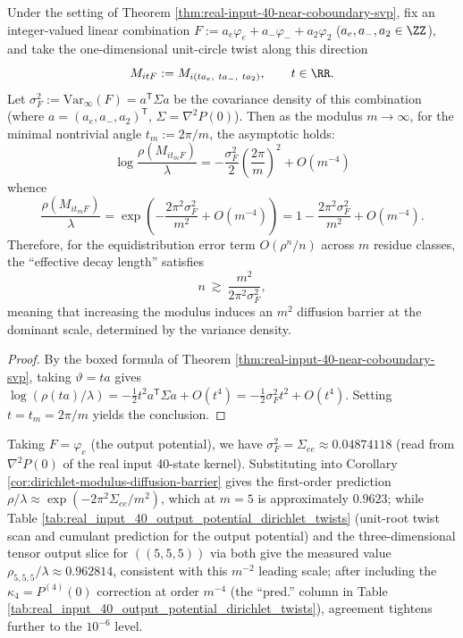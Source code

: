 \begin{corollary}\label{cor:dirichlet-modulus-diffusion-barrier}
Under the setting of Theorem \ref{thm:real-input-40-near-coboundary-svp}, fix an integer-valued linear combination
\(
F:=a_e\varphi_e+a_-\varphi_-+a_2\varphi_2
\)
(\(a_e,a_-,a_2\in\ZZ\)), and take the one-dimensional unit-circle twist along this direction
\[
M_{itF}:=M_{i(t a_e,\ t a_-,\ t a_2)},\qquad t\in\RR.
\]
Let
\(
\sigma_F^2:=\mathrm{Var}_\infty(F)=a^{\mathsf T}\Sigma a
\)
be the covariance density of this combination (where \(a=(a_e,a_-,a_2)^{\mathsf T}\), \(\Sigma=\nabla^2P(0)\)).
Then as the modulus \(m\to\infty\), for the minimal nontrivial angle \(t_m:=2\pi/m\), the asymptotic holds:
\[
\boxed{\;
\log\frac{\rho(M_{it_mF})}{\lambda}
=-\frac{\sigma_F^2}{2}\left(\frac{2\pi}{m}\right)^2+O(m^{-4})
\;}
\]
whence
\[
\boxed{\;
\frac{\rho(M_{it_mF})}{\lambda}
=\exp\!\left(-\frac{2\pi^2\sigma_F^2}{m^2}+O(m^{-4})\right)
=1-\frac{2\pi^2\sigma_F^2}{m^2}+O(m^{-4}).
\;}
\]
Therefore, for the equidistribution error term \(O(\rho^n/n)\) across $m$ residue classes, the ``effective decay length'' satisfies
\[
n\ \gtrsim\ \frac{m^2}{2\pi^2\sigma_F^2},
\]
meaning that increasing the modulus induces an \(m^2\) diffusion barrier at the dominant scale, determined by the variance density.
\end{corollary}

\begin{proof}
By the boxed formula of Theorem \ref{thm:real-input-40-near-coboundary-svp}, taking \(\vartheta=t a\) gives
\(
\log(\rho(ta)/\lambda)=-\frac12 t^2 a^{\mathsf T}\Sigma a+O(t^4)
=-\frac12\sigma_F^2 t^2+O(t^4)
\).
Setting \(t=t_m=2\pi/m\) yields the conclusion.
\end{proof}

\begin{remark}[Numerical Closed-Loop: The Worst Ratio for the Output Potential at \texorpdfstring{$m=5$}{m=5}]
Taking \(F=\varphi_e\) (the output potential), we have \(\sigma_F^2=\Sigma_{ee}\approx 0.04874118\) (read from \(\nabla^2P(0)\) of the real input 40-state kernel).
Substituting into Corollary \ref{cor:dirichlet-modulus-diffusion-barrier} gives the first-order prediction
\(
\rho/\lambda\approx \exp(-2\pi^2\Sigma_{ee}/m^2)
\), which at \(m=5\) is approximately \(0.9623\);
while Table \ref{tab:real_input_40_output_potential_dirichlet_twists} (unit-root twist scan and cumulant prediction for the output potential) and the three-dimensional tensor output slice for \(((5,5,5))\) via \verb|| both give the measured value
\(
\rho_{5,5,5}/\lambda\approx 0.962814
\), consistent with this \(m^{-2}\) leading scale; after including the \(\kappa_4=P^{(4)}(0)\) correction at order \(m^{-4}\) (the ``pred.'' column in Table \ref{tab:real_input_40_output_potential_dirichlet_twists}), agreement tightens further to the \(10^{-6}\) level.
\end{remark}

